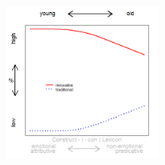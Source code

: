 \documentclass[12pt, table]{beamer}
\begin{document}
\begin{frame}
\begin{minipage}[t]{\linewidth}
\begin{minipage}{.45\linewidth}
\begin{tabular}{cccccccccc }
\end{tabular}
\end{minipage}
\hfill
\begin{minipage}{.45\linewidth}
\begin{figure}
\includegraphics[width=5cm]{images/LangChang17.png}
\end{figure}
\end{minipage}
\end{minipage}
\end{frame}
\end{document}

